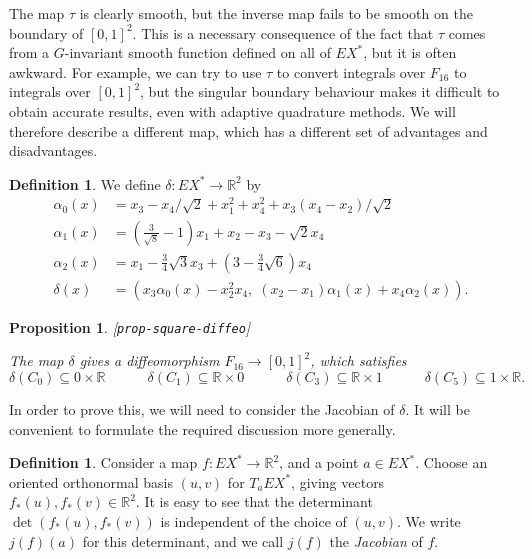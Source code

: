 \documentclass[reqno]{amsart}
\newcommand{\lbl}[1]{\label{#1}\textup{[\texttt{#1}]}\par}
\newcommand{\lbl}{\label}
\newcommand{\al}        {\alpha}
\newcommand{\dl}        {\delta}
\newcommand{\R}         {{\mathbb{R}}}
\newcommand{\tm}        {\times}
\newcommand{\sse}       {\subseteq}
\newcommand{\rt}        {\sqrt{2}}
\renewcommand{\:}{\colon}
\newtheorem{proposition}[theorem]{Proposition}
\theoremstyle{definition}
\newtheorem{definition}[theorem]{Definition}
\begin{document}
The map $\tau$ is clearly smooth, but the inverse map fails to be
smooth on the boundary of $[0,1]^2$.  This is a necessary consequence
of the fact that $\tau$ comes from a $G$-invariant smooth function
defined on all of $EX^*$, but it is often awkward.  For example, we
can try to use $\tau$ to convert integrals over $F_{16}$ to integrals
over $[0,1]^2$, but the singular boundary behaviour makes it difficult
to obtain accurate results, even with adaptive quadrature methods.  We
will therefore describe a different map, which has a different set of
advantages and disadvantages.

\begin{definition}
 We define $\dl\:EX^*\to\R^2$ by
 \begin{align*}
  \al_0(x) &= x_3 - x_4/\rt + x_1^2 + x_4^2 + x_3(x_4 - x_2)/\rt \\
  \al_1(x) &= (\tfrac{3}{\sqrt{8}}-1)x_1+x_2-x_3-\rt x_4 \\
  \al_2(x) &= x_1 - \tfrac{3}{4}\sqrt{3}x_3 +
               (3-\tfrac{3}{4}\sqrt{6})x_4 \\
  \dl(x)   &=
   \left(x_3\al_0(x) - x_2^2x_4,\; (x_2-x_1)\al_1(x) + x_4\al_2(x)\right).
 \end{align*}
\end{definition}

\begin{proposition}\lbl{prop-square-diffeo}
 The map $\dl$ gives a diffeomorphism $F_{16}\to[0,1]^2$, which satisfies
 \[ \dl(C_0)\sse 0 \tm\R \hspace{3em}
    \dl(C_1)\sse \R\tm 0 \hspace{3em}
    \dl(C_3)\sse \R\tm 1 \hspace{3em}
    \dl(C_5)\sse 1 \tm\R.
 \]
\end{proposition}

In order to prove this, we will need to consider the Jacobian of
$\dl$.  It will be convenient to formulate the required discussion
more generally.
\begin{definition}
 Consider a map $f\:EX^*\to\R^2$, and a point $a\in EX^*$.  Choose an
 oriented orthonormal basis $(u,v)$ for $T_aEX^*$, giving vectors
 $f_*(u),f_*(v)\in\R^2$.  It is easy to see that the determinant
 $\det(f_*(u),f_*(v))$ is independent of the choice of $(u,v)$. We
 write $j(f)(a)$ for this determinant, and we call $j(f)$ the
 \emph{Jacobian} of $f$.
\end{definition}
\end{document}
